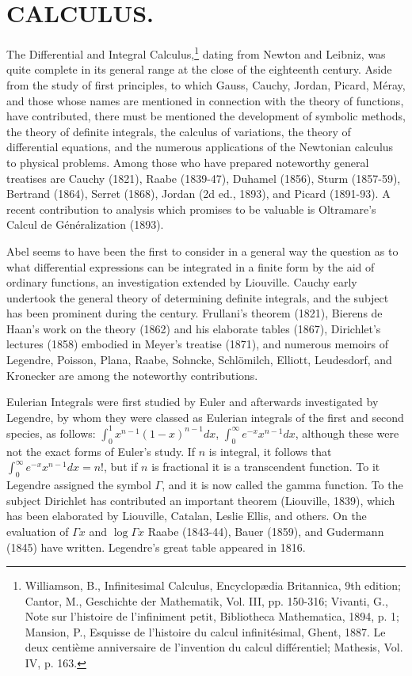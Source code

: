 \documentclass[oneside]{book}
\begin{document}
{\chapter{CALCULUS.}

The Differential and Integral Calculus,\footnote{Williamson, B.,
Infinitesimal Calculus, Encyclop\ae{}dia Britannica, 9th edition;
Cantor, M., Geschichte der Mathematik, Vol. III, pp. 150-316;
Vivanti, G., Note sur l'histoire de l'infiniment petit, Bibliotheca
Mathematica, 1894, p. 1; Mansion, P., Esquisse de l'histoire du calcul
infinit\'esimal, Ghent, 1887. Le deux centi\`eme anniversaire
de l'invention du calcul diff\'erentiel; Mathesis, Vol. IV, p. 163.}
dating from Newton and Leibniz, was quite complete in its general
range at the close of the eighteenth century. Aside from the study
of first principles, to which Gauss, Cauchy, Jordan, Picard, M\'eray,
and those whose names are mentioned in connection with the theory of
functions, have contributed, there must be mentioned the development
of symbolic methods, the theory of definite integrals, the calculus
of variations, the theory of differential equations, and the
numerous applications of the Newtonian calculus to physical
problems. Among those who have prepared noteworthy general treatises
are Cauchy (1821), Raabe (1839-47), Duhamel (1856), Sturm (1857-59),
Bertrand (1864), Serret (1868), Jordan (2d ed., 1893), and Picard
(1891-93). A recent contribution to analysis which promises to be
valuable is Oltramare's Calcul de G\'en\'eralization (1893).

Abel seems to have been the first to consider in a general way the
question as to what differential expressions can be integrated in a
finite form by the aid of ordinary functions, an investigation
extended by Liouville. Cauchy early undertook the general theory of
determining definite integrals, and the subject has been prominent
during the century. Frullani's theorem (1821), Bierens de Haan's
work on the theory (1862) and his elaborate tables (1867),
Dirichlet's lectures (1858) embodied in Meyer's treatise (1871), and
numerous memoirs of Legendre, Poisson, Plana, Raabe, Sohncke,
Schl\"omilch, Elliott, Leudesdorf, and Kronecker are among the
noteworthy contributions.

Eulerian Integrals were first studied by Euler and afterwards
investigated by Legendre, by whom they were classed as Eulerian
integrals of the first and second species, as follows: $\int_0^1
x^{n-1}(1 - x)^{n-1}dx$, $\int_0^\infty e^{-x} x^{n-1}dx$, although
these were not the exact forms of Euler's study. If $n$ is
integral, it follows that $\int_0^\infty e^{-x}x^{n-1}dx = n!$, but
if $n$ is fractional it is a transcendent function. To it
Legendre assigned the symbol $\Gamma$, and it is now called the
gamma function. To the subject Dirichlet has contributed an
important theorem (Liouville, 1839), which has been elaborated by
Liouville, Catalan, Leslie Ellis, and others. On the evaluation of
$\Gamma x$ and $\log \Gamma x$ Raabe (1843-44), Bauer (1859), and
Gudermann (1845) have written. Legendre's great table appeared in
1816.

}
\end{document}
